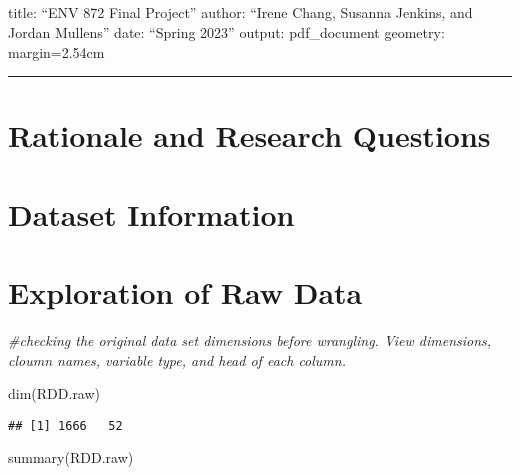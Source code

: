 \documentclass[
]{article}
\author{}
\date{\vspace{-2.5em}}
\newenvironment{Shaded}{\begin{snugshade}}{\end{snugshade}}
\newcommand{\CommentTok}[1]{\textcolor[rgb]{0.56,0.35,0.01}{\textit{#1}}}
\newcommand{\FunctionTok}[1]{\textcolor[rgb]{0.00,0.00,0.00}{#1}}
\newcommand{\NormalTok}[1]{#1}
\begin{document}
\hypertarget{section}{%
\subsection{\texorpdfstring{\newpage}{}}\label{section}}

title: ``ENV 872 Final Project'' author: ``Irene Chang, Susanna Jenkins,
and Jordan Mullens'' date: ``Spring 2023'' output: pdf\_document
geometry: margin=2.54cm

\begin{center}\rule{0.5\linewidth}{0.5pt}\end{center}

\newpage
\tableofcontents 
\newpage
\listoftables 
\newpage
\listoffigures 
\newpage

\hypertarget{rationale-and-research-questions}{%
\section{Rationale and Research
Questions}\label{rationale-and-research-questions}}

\newpage

\hypertarget{dataset-information}{%
\section{Dataset Information}\label{dataset-information}}

\newpage

\hypertarget{exploration-of-raw-data}{%
\section{Exploration of Raw Data}\label{exploration-of-raw-data}}

\begin{Shaded}
\begin{Highlighting}[]
\CommentTok{\#checking the original data set dimensions before wrangling. View dimensions, cloumn names, variable type, and head of each column.}

\FunctionTok{dim}\NormalTok{(RDD.raw)}
\end{Highlighting}
\end{Shaded}

\begin{verbatim}
## [1] 1666   52
\end{verbatim}

\begin{Shaded}
\begin{Highlighting}[]
\FunctionTok{summary}\NormalTok{(RDD.raw)}
\end{Highlighting}
\end{Shaded}
\end{document}

